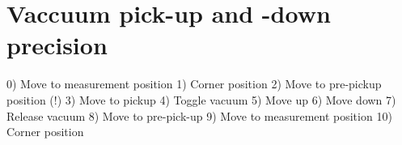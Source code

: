 \section{Vaccuum pick-up and -down precision}

0) Move to measurement position
1) Corner position
2) Move to pre-pickup position (!)
3) Move to pickup
4) Toggle vacuum 
5) Move up
6) Move down
7) Release vacuum
8) Move to pre-pick-up
9) Move to measurement position
10) Corner position

